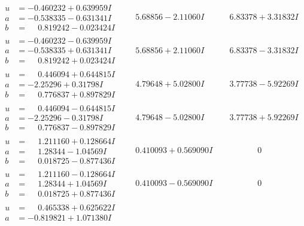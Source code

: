 \documentclass[1p]{elsarticle_modified}
\theoremstyle{definition}
\begin{document}
$$\begin{array}{c|c|c}
\begin{aligned}
u &= -0.460232 + 0.639959 I \\
a &= -0.538335 - 0.631341 I \\
b &= \phantom{-}0.819242 - 0.023424 I\end{aligned}
 & \phantom{-}5.68856 - 2.11060 I & \phantom{-}6.83378 + 3.31832 I \\ \hline\begin{aligned}
u &= -0.460232 - 0.639959 I \\
a &= -0.538335 + 0.631341 I \\
b &= \phantom{-}0.819242 + 0.023424 I\end{aligned}
 & \phantom{-}5.68856 + 2.11060 I & \phantom{-}6.83378 - 3.31832 I \\ \hline\begin{aligned}
u &= \phantom{-}0.446094 + 0.644815 I \\
a &= -2.25296 + 0.31798 I \\
b &= \phantom{-}0.776837 + 0.897829 I\end{aligned}
 & \phantom{-}4.79648 + 5.02800 I & \phantom{-}3.77738 - 5.92269 I \\ \hline\begin{aligned}
u &= \phantom{-}0.446094 - 0.644815 I \\
a &= -2.25296 - 0.31798 I \\
b &= \phantom{-}0.776837 - 0.897829 I\end{aligned}
 & \phantom{-}4.79648 - 5.02800 I & \phantom{-}3.77738 + 5.92269 I \\ \hline\begin{aligned}
u &= \phantom{-}1.211160 + 0.128664 I \\
a &= \phantom{-}1.28344 - 1.04569 I \\
b &= \phantom{-}0.018725 - 0.877436 I\end{aligned}
 & \phantom{-}0.410093 + 0.569090 I & \phantom{-0.000000 } 0 \\ \hline\begin{aligned}
u &= \phantom{-}1.211160 - 0.128664 I \\
a &= \phantom{-}1.28344 + 1.04569 I \\
b &= \phantom{-}0.018725 + 0.877436 I\end{aligned}
 & \phantom{-}0.410093 - 0.569090 I & \phantom{-0.000000 } 0 \\ \hline\begin{aligned}
u &= \phantom{-}0.465338 + 0.625622 I \\
a &= -0.819821 + 1.071380 I \\

\end{aligned}
\end{array}$$
\end{document}
